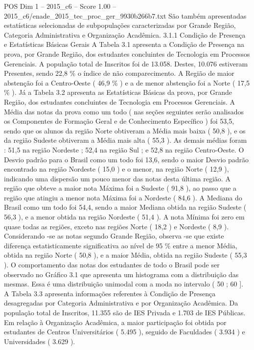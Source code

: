 \begin{textsample}{POS Dim 1 – 2015\_c6 – Score 1.00 – 2015\_c6/enade\_2015\_tec\_proc\_ger\_9930b266b7.txt}
São também apresentadas estatísticas selecionadas de subpopulações caracterizadas por Grande Região, Categoria Administrativa e Organização Acadêmica. 3.1.1 Condição de Presença e Estatísticas Básicas Gerais A Tabela 3.1 apresenta a Condição de Presença na prova, por Grande Região, dos estudantes concluintes de Tecnologia em Processos Gerenciais.
A população total de Inscritos foi de 13.058.
Destes, 10.076 estiveram Presentes, sendo 22,8 \% o índice de não comparecimento.
A Região de maior abstenção foi a Centro-Oeste ( 46,9 \% ) e a de menor abstenção foi a Norte ( 17,5 \% ).
Já a Tabela 3.2 apresenta as Estatísticas Básicas da prova, por Grande Região, dos estudantes concluintes de Tecnologia em Processos Gerenciais.
A Média das notas da prova como um todo ( nas seções seguintes serão analisados os Componentes de Formação Geral e de Conhecimento Específico ) foi 53,5, sendo que os alunos da região Norte obtiveram a Média mais baixa ( 50,8 ), e os da região Sudeste obtiveram a Média mais alta ( 55,3 ).
As demais médias foram : 51,5 na região Nordeste ; 52,4 na região Sul ; e 52,8 na região Centro-Oeste.
O Desvio padrão para o Brasil como um todo foi 13,6, sendo o maior Desvio padrão encontrado na região Nordeste ( 15,0 ) e o menor, na região Norte ( 12,9 ), indicando uma dispersão um pouco menor das notas desta última região.
A região que obteve a maior nota Máxima foi a Sudeste ( 91,8 ), ao passo que a região que atingiu a menor nota Máxima foi a Nordeste ( 84,6 ).
A Mediana do Brasil como um todo foi 54,4, sendo a maior Mediana obtida na região Sudeste ( 56,3 ), e a menor obtida na região Nordeste ( 51,4 ).
A nota Mínima foi zero em quase todas as regiões, exceto nas regiões Norte ( 18,2 ) e Nordeste ( 8,9 ).
Considerando -se as notas segundo Grande Região, observa -se que existe diferença estatisticamente significativa ao nível de 95 \% entre a menor Média, obtida na região Norte ( 50,8 ), e a maior Média, obtida na região Sudeste ( 55,3 ).
O comportamento das notas dos estudantes de todo o Brasil pode ser observado no Gráfico 3.1 que apresenta um histograma com a distribuição das mesmas.
Essa é uma distribuição unimodal com a moda no intervalo ( 50 ; 60 ].
A Tabela 3.3 apresenta informações referentes à Condição de Presença desagregadas por Categoria Administrativa e por Organização Acadêmica.
Da população total de Inscritos, 11.355 são de IES Privada e 1.703 de IES Públicas.
Em relação à Organização Acadêmica, a maior participação foi obtida por estudantes de Centros Universitários ( 5.495 ), seguido de Faculdades ( 3.934 ) e Universidades ( 3.629 ).

\end{textsample}
